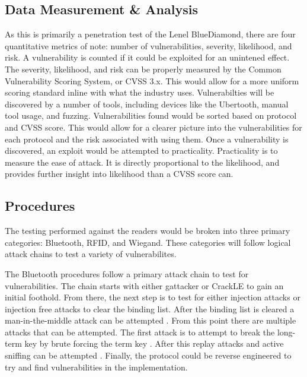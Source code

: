 \documentclass[10pt,twocolumn,letterpaper]{article}
\begin{document}
\subsection{Data Measurement \& Analysis}
As this is primarily a penetration test of the Lenel BlueDiamond, there are four quantitative metrics of note: number of vulnerabilities, severity, likelihood, and risk. A vulnerability is counted if it could be exploited for an unintened effect. The severity, likelihood, and risk can be properly measured by the Common Vulnerability Scoring System, or CVSS 3.x. This would allow for a more uniform scoring standard inline with what the industry uses. Vulnerabilties will be discovered by a number of tools, including devices like the Ubertooth, manual tool usage, and fuzzing. Vulnerabilities found would be sorted based on protocol and CVSS score. This would allow for a clearer picture into the vulnerabilities for each protocol and the risk associated with using them. Once a vulnerability is discovered, an exploit would be attempted to practicality. Practicality is to measure the ease of attack. It is directly proportional to the likelihood, and provides further insight into likelihood than a CVSS score can.

\subsection{Procedures}
The testing performed against the readers would be broken into three primary categories: Bluetooth, RFID, and Wiegand.  These categories will follow logical attack chains to test a variety of vulnerabilites.

The Bluetooth procedures follow a primary attack chain to test for vulnerabilities.  The chain starts with either gattacker \cite{GattackingJasek} \cite{BluetoothMITMTal} or CrackLE \cite{10.1145/3190645.3190693} to gain an initial foothold.  From there, the next step is to test for either injection attacks or injection free attacks \cite{jaihc19} to clear the binding list.  After the binding list is cleared a man-in-the-middle attack can be attempted \cite{lonzetta2018security} \cite{osullivan} \cite{BluetoothMITMTal}.  From this point there are multiple attacks that can be attempted.  The first attack is to attempt to break the long-term key by brute forcing the term key \cite{sevier2019securityofble} \cite{179196}.  After this replay attacks and active sniffing can be attempted \cite{filizzola2018security} \cite{osullivan}.  Finally, the protocol could be reverse engineered to try and find vulnerabilities in the implementation.
\end{document}
